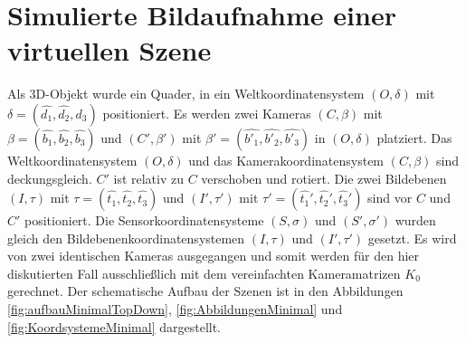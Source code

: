 \pagebreak

%



\section{Simulierte Bildaufnahme einer virtuellen Szene}

Als 3D-Objekt wurde ein Quader, in ein Weltkoordinatensystem $(O,\delta)$ mit $\delta = (\hat{d_1},\hat{d_2},\hat{d_3})$ positioniert. Es werden zwei Kameras $(C,\beta)$ mit $\beta = (\hat{b_1},\hat{b_2},\hat{b_3})$ und $(C',\beta')$ mit $\beta' = (\hat{b'_1},\hat{b'_2},\hat{b'_3})$ in $(O,\delta)$ platziert. Das Weltkoordinatensystem $(O,\delta)$ und das Kamerakoordinatensystem $(C,\beta)$ sind deckungsgleich. $C'$ ist relativ zu $C$ verschoben und rotiert. Die zwei Bildebenen $(I,\tau)$ mit $\tau = (\hat{t_1},\hat{t_2},\hat{t_3})$ und $(I',\tau')$ mit $\tau' = (\hat{t_1}',\hat{t_2}',\hat{t_3}')$ sind vor $C$ und $C'$ positioniert. Die Sensorkoordinatensysteme $(S,\sigma)$ und $(S',\sigma')$ wurden gleich den Bildebenenkoordinatensystemen $(I,\tau)$ und $(I',\tau')$ gesetzt. Es wird von zwei identischen Kameras ausgegangen und somit werden für den hier diskutierten Fall ausschließlich mit dem vereinfachten Kameramatrizen $K_0$ gerechnet. Der schematische Aufbau der Szenen ist in den Abbildungen \ref{fig:aufbauMinimalTopDown}, \ref{fig:AbbildungenMinimal} und \ref{fig:KoordsystemeMinimal} dargestellt.




